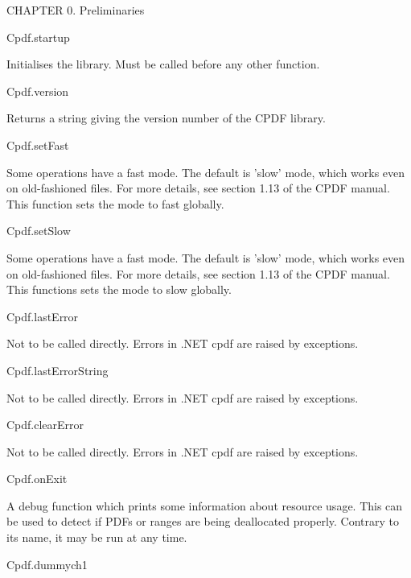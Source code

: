 CHAPTER 0. Preliminaries

Cpdf.startup


Initialises the library. Must be called before any other function.


Cpdf.version


Returns a string giving the version number of the CPDF library.


Cpdf.setFast


Some operations have a fast mode. The default is 'slow' mode, which works
even on old-fashioned files. For more details, see section 1.13 of the
CPDF manual. This function sets the mode to fast globally.


Cpdf.setSlow


Some operations have a fast mode. The default is 'slow' mode, which works
even on old-fashioned files. For more details, see section 1.13 of the
CPDF manual. This functions sets the mode to slow globally.


Cpdf.lastError


Not to be called directly. Errors in .NET cpdf are raised by exceptions.


Cpdf.lastErrorString


Not to be called directly. Errors in .NET cpdf are raised by exceptions.


Cpdf.clearError


Not to be called directly. Errors in .NET cpdf are raised by exceptions.


Cpdf.onExit


A debug function which prints some information about
resource usage. This can be used to detect if PDFs or ranges are being
deallocated properly. Contrary to its name, it may be run at any time.


Cpdf.dummych1

